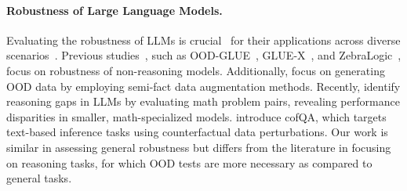 \paragraph{Robustness of Large Language Models.}



Evaluating the robustness of LLMs is crucial~\cite{muennighoff2025s1,guo2025deepseek} for their applications across diverse scenarios~\cite{wang2023robustness,glazer2024frontiermath,li2024gsm}. Previous studies~\cite{li2024openai}, such as OOD-GLUE~\citep{yuan2023revisiting}, GLUE-X~\citep{yang2023glue}, and ZebraLogic~\citep{zebralogic2024}, focus on robustness of non-reasoning models. 
Additionally, \citet{yang2022factmix} focus on generating OOD data by employing semi-fact data augmentation methods. Recently, \citet{hosseini2024not} identify reasoning gaps in LLMs by evaluating math problem pairs, revealing performance disparities in smaller, math-specialized models. \citet{wu2024mrke} introduce cofQA, which targets text-based inference tasks using counterfactual data perturbations. 
Our work is similar in assessing general robustness but differs from the literature in focusing on reasoning tasks, for which OOD tests are more necessary as compared to general tasks.

